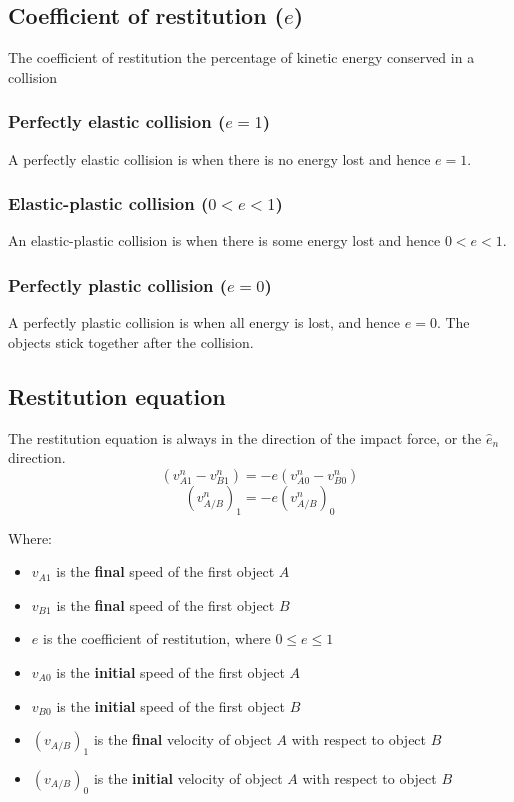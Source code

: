 \documentclass[11pt]{article}
\begin{document}
\subsection{Coefficient of restitution (\(e\))}
\label{sec:org8446e6d}
The coefficient of restitution the percentage of kinetic energy conserved in a collision
\subsubsection{Perfectly elastic collision (\(e = 1\))}
\label{sec:org56139dd}
A perfectly elastic collision is when there is no energy lost and hence \(e = 1\).
\subsubsection{Elastic-plastic collision (\(0 < e < 1\))}
\label{sec:orga2fd5dd}
An elastic-plastic collision is when there is some energy lost and hence \(0 < e < 1\).
\subsubsection{Perfectly plastic collision (\(e = 0\))}
\label{sec:org3d53f27}
A perfectly plastic collision is when all energy is lost, and hence \(e = 0\). The objects stick together after the collision.
\subsection{Restitution equation}
\label{sec:orgc882eb1}
The restitution equation is always in the direction of the impact force, or the \(\hat{e}_n\) direction.
\[(v_{A1}^n - v_{B1}^n) = - e(v_{A0}^n - v_{B0}^n)\]
\[(v_{A/B}^n)_1 = -e (v_{A/B}^n)_0\]

Where:
\begin{itemize}
\item \(v_{A1}\) is the \textbf{final} speed of the first object \(A\)
\item \(v_{B1}\) is the \textbf{final} speed of the first object \(B\)
\item \(e\) is the coefficient of restitution, where \(0 \le e \le 1\)
\item \(v_{A0}\) is the \textbf{initial} speed of the first object \(A\)
\item \(v_{B0}\) is the \textbf{initial} speed of the first object \(B\)
\item \((v_{A/B})_1\) is the \textbf{final} velocity of object \(A\) with respect to object \(B\)
\item \((v_{A/B})_0\) is the \textbf{initial} velocity of object \(A\) with respect to object \(B\)
\end{itemize}
\end{document}
